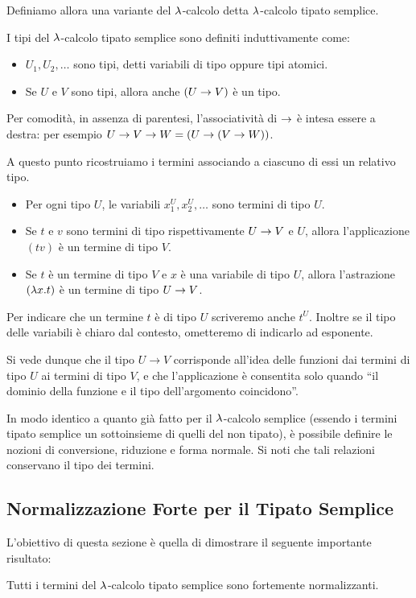 \documentclass[]{marticle}
\begin{document}
Definiamo allora una variante del $\lambda$-calcolo detta $\lambda$-calcolo tipato
semplice.

\begin{block}[Definizione]
    I tipi del $\lambda$-calcolo tipato semplice sono definiti induttivamente come:
    \begin{itemize}
        \item $U_1, U_2, \dots$ sono tipi, detti variabili di tipo oppure tipi
            atomici.
        \item Se $U$ e $V$ sono tipi, allora anche $(U\rightarrow V)$ \`e un tipo.
    \end{itemize}
    Per comodit\`a, in assenza di parentesi, l'associativit\`a di $\rightarrow$ \`e
    intesa essere a destra: per esempio $U\rightarrow V\rightarrow W = (U\rightarrow(V\rightarrow W))$.

    A questo punto ricostruiamo i termini associando a ciascuno di essi un
    relativo tipo.
    \begin{itemize}
        \item Per ogni tipo $U$, le variabili $x^U_1, x^U_2, \dots$ sono termini
            di tipo $U$.
        \item Se $t$ e $v$ sono termini di tipo rispettivamente $U\rightarrow V$ e $U$,
            allora l'applicazione $(tv)$ \`e un termine di tipo $V$.
        \item Se $t$ \`e un termine di tipo $V$ e $x$ \`e una variabile di tipo
            $U$, allora l'astrazione $(\lambda x.  t)$ \`e un termine di tipo $U\rightarrow
            V$.
    \end{itemize}

    Per indicare che un termine $t$ \`e di tipo $U$ scriveremo anche $t^U$.
    Inoltre se il tipo delle variabili \`e chiaro dal contesto, ometteremo di
    indicarlo ad esponente.
\end{block}

Si vede dunque che il tipo $U\rightarrow V$ corrisponde all'idea delle funzioni
dai termini di tipo $U$ ai termini di tipo $V$, e che l'applicazione \`e
consentita solo quando ``il dominio della funzione e il tipo dell'argomento
coincidono''.

In modo identico a quanto gi\`a fatto per il $\lambda$-calcolo semplice (essendo i
termini tipato semplice un sottoinsieme di quelli del non tipato), \`e possibile
definire le nozioni di conversione, riduzione e forma normale. Si noti che tali
relazioni conservano il tipo dei termini.

\subsection{Normalizzazione Forte per il Tipato Semplice}
L'obiettivo di questa sezione \`e quella di dimostrare il seguente importante
risultato:
\begin{block}[Teorema]
    Tutti i termini del $\lambda$-calcolo tipato semplice sono fortemente
    normalizzanti.
\end{block}
\end{document}
